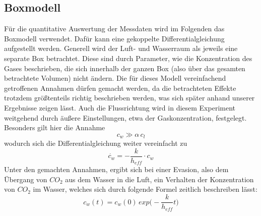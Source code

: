 \documentclass[12pt]{article}
\begin{document}
\subsection{Boxmodell}
Für die quantitative Auswertung der Messdaten wird im Folgenden das Boxmodell verwendet. Dafür kann eine gekoppelte Differentialgleichung aufgestellt werden. Generell wird der Luft- und Wasserraum als jeweils eine separate Box betrachtet. Diese sind durch Parameter, wie die Konzentration des Gases beschrieben, die sich innerhalb der ganzen Box (also über das gesamten betrachtete Volumen) nicht ändern.
Die für dieses Modell vereinfachend getroffenen Annahmen dürfen gemacht werden, da die betrachteten Effekte trotzdem größtenteils richtig beschrieben werden, was sich später anhand unserer Ergebnisse zeigen lässt.  
Auch die Flussrichtung wird in diesem Experiment weitgehend durch äußere Einstellungen, etwa der Gaskonzentration, festgelegt.
Besonders gilt hier die Annahme 
\begin{equation}\label{Luftkonzentration}
	c_w \gg \alpha \, c_l
\end{equation}
 wodurch sich die Differentialgleichung weiter vereinfacht zu
\begin{equation}
	\dot{c_w} = - \frac{k}{h_{eff}} \cdot c_w
\end{equation}
Unter den gemachten Annahmen, ergibt sich bei einer Evasion, also dem Übergang von $CO_2$ aus dem Wasser in die Luft, ein Verhalten der Konzentration von $CO_2$ im Wasser, welches sich durch folgende Formel zeitlich beschreiben lässt:
\begin{equation}\label{exponential}
c_w(t) = c_w(0) \, exp\Big(- \frac{k}{h_{eff}}t\Big)
\end{equation}
\end{document}

